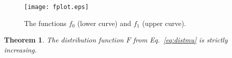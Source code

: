 \documentclass[11pt,a4paper]{amsart}
\theoremstyle{plain}
\newtheorem{theorem}{Theorem}[section]
\theoremstyle{definition}
\numberwithin{equation}{section}
\begin{document}
\begin{figure}[htp]
   \texttt{[image: fplot.eps]}
\caption{The functions $f^{}_{0}$ (lower curve) and
  $f^{}_{1}$ (upper curve).}
\label{Sternperiod}
\end{figure}



\begin{theorem}\label{thm:strict} 
  The distribution function\/ $F$ from Eq.~\eqref{eq:distmu} is strictly
  increasing.
\end{theorem}
\end{document}
